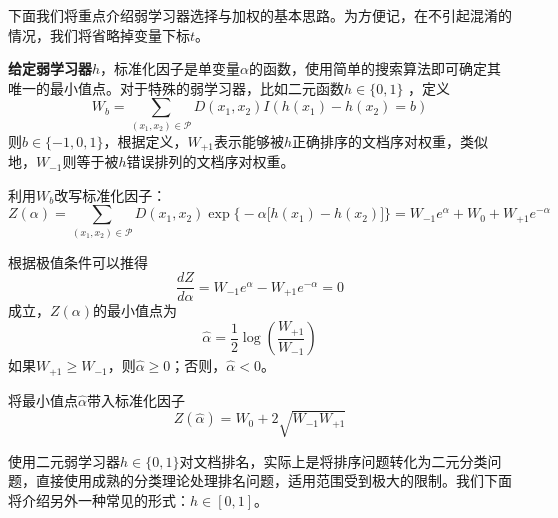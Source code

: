 下面我们将重点介绍弱学习器选择与加权的基本思路。为方便记，在不引起混淆的情况，我们将省略掉变量下标$t$。

\textbf{给定弱学习器$h$}，标准化因子是单变量$\alpha$的函数，使用简单的搜索算法即可确定其唯一的最小值点。对于特殊的弱学习器，比如二元函数$h\in\{0,1\}$ ，定义
\begin{equation}
    W_b = \sum\limits_{(x_1,x_2)\in \mathscr P} D(x_1,x_2) I(h(x_1) - h(x_2) = b)
\end{equation}
则$b\in\{-1,0,1\}$，根据定义，$W_{+1}$表示能够被$h$正确排序的文档序对权重，类似地，$W_{-1}$则等于被$h$错误排列的文档序对权重。

利用$W_b$改写标准化因子：
\begin{equation}
    Z(\alpha)= \sum\limits_{(x_1,x_2)\in \mathscr P} D(x_1,x_2) \exp\big\{-\alpha \big[h(x_1) - h(x_2)\big]\big\} = W_{-1} e^{\alpha} + W_0 + W_{+1} e^{-\alpha}
\end{equation}

根据极值条件可以推得
\begin{equation}
    \frac{dZ}{d\alpha} = W_{-1} e^{\alpha} - W_{+1} e^{-\alpha} = 0
\end{equation}
成立，$Z(\alpha)$的最小值点为
\begin{equation}
    \hat\alpha = \frac{1}{2} \log(\frac{W_{+1}}{W_{-1}})
\end{equation}
如果$W_{+1}\ge W_{-1}$，则$\hat\alpha\ge 0$；否则，$\hat\alpha< 0$。

将最小值点$\hat\alpha$带入标准化因子
\begin{equation}\label{eq:optimalbinaryclassifier}
    Z(\hat\alpha) = W_0 + 2\sqrt{W_{-1}W_{+1}}
\end{equation}

使用二元弱学习器$h\in\{0,1\}$对文档排名，实际上是将排序问题转化为二元分类问题，直接使用成熟的分类理论处理排名问题，适用范围受到极大的限制。我们下面将介绍另外一种常见的形式：$h\in [0,1]$。

